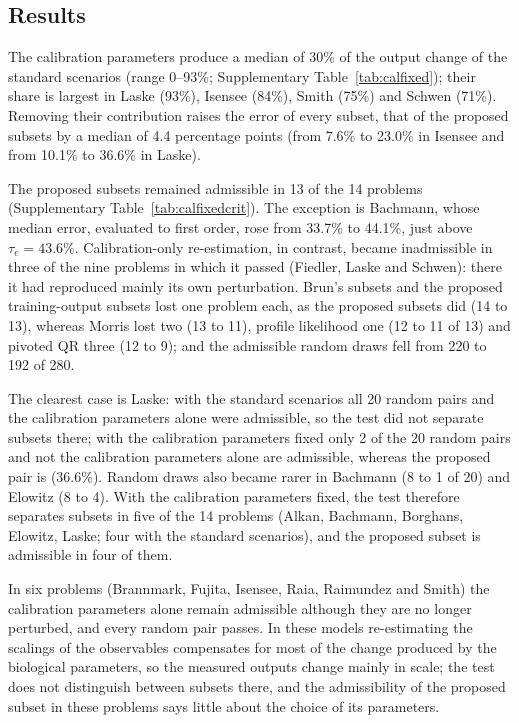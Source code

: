 \subsection*{Results}
The calibration parameters produce a median of 30\% of the output change of the standard scenarios (range 0--93\%; Supplementary Table~\ref{tab:calfixed}); their share is largest in Laske (93\%), Isensee (84\%), Smith (75\%) and Schwen (71\%). Removing their contribution raises the error of every subset, that of the proposed subsets by a median of 4.4 percentage points (from 7.6\% to 23.0\% in Isensee and from 10.1\% to 36.6\% in Laske).

The proposed subsets remained admissible in 13 of the 14 problems (Supplementary Table~\ref{tab:calfixedcrit}). The exception is Bachmann, whose median error, evaluated to first order, rose from 33.7\% to 44.1\%, just above $\tau_e=43.6\%$. Calibration-only re-estimation, in contrast, became inadmissible in three of the nine problems in which it passed (Fiedler, Laske and Schwen): there it had reproduced mainly its own perturbation. Brun's subsets and the proposed training-output subsets lost one problem each, as the proposed subsets did (14 to 13), whereas Morris lost two (13 to 11), profile likelihood one (12 to 11 of 13) and pivoted QR three (12 to 9); and the admissible random draws fell from 220 to 192 of 280.

The clearest case is Laske: with the standard scenarios all 20 random pairs and the calibration parameters alone were admissible, so the test did not separate subsets there; with the calibration parameters fixed only 2 of the 20 random pairs and not the calibration parameters alone are admissible, whereas the proposed pair is (36.6\%). Random draws also became rarer in Bachmann (8 to 1 of 20) and Elowitz (8 to 4). With the calibration parameters fixed, the test therefore separates subsets in five of the 14 problems (Alkan, Bachmann, Borghans, Elowitz, Laske; four with the standard scenarios), and the proposed subset is admissible in four of them.

In six problems (Brannmark, Fujita, Isensee, Raia, Raimundez and Smith) the calibration parameters alone remain admissible although they are no longer perturbed, and every random pair passes. In these models re-estimating the scalings of the observables compensates for most of the change produced by the biological parameters, so the measured outputs change mainly in scale; the test does not distinguish between subsets there, and the admissibility of the proposed subset in these problems says little about the choice of its parameters.

